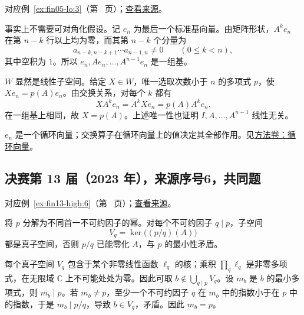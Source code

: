 \documentclass[12pt,fontset=fandol]{ctexart}
\begin{document}
对应例~\ref{ex:fin05-lo:3}（第~\pageref{ex:fin05-lo:3} 页）；\href{https://github.com/lzxcr/cmc-mathematics/blob/64916fa1fdbc3e444a652eca204d5669058ee321/src/problems/finals/05/06.md}{查看来源}。

\begin{solve}

事实上不需要可对角化假设。记 $e_n$ 为最后一个标准基向量。由矩阵形状，$A^ke_n$ 在第 $n-k$ 行以上均为零，而其第 $n-k$ 个分量为
\[
a_{n-k,n-k+1}\cdots a_{n-1,n}\ne0\qquad(0\le k<n),
\]
其中空积为 $1$。所以 $e_n,Ae_n,\ldots,A^{n-1}e_n$ 是一组基。

$W$ 显然是线性子空间。给定 $X\in W$，唯一选取次数小于 $n$ 的多项式 $p$，使 $Xe_n=p(A)e_n$。由交换关系，对每个 $k$ 都有
\[
XA^ke_n=A^kXe_n=p(A)A^ke_n.
\]
在一组基上相同，故 $X=p(A)$。上述唯一性也证明 $I,A,\ldots,A^{n-1}$ 线性无关。

\end{solve}

\begin{remark}[方法与条件]

$e_n$ 是一个循环向量；交换算子在循环向量上的值决定其全部作用。见\hyperref[app:linear-cyclic]{方法卷：循环向量}。

\end{remark}

\subsection{决赛第 13 届（2023 年），来源序号6，共同题}\label{ans:fin13-high:6}\label{pr:fin13-high:6}

对应例~\ref{ex:fin13-high:6}（第~\pageref{ex:fin13-high:6} 页）；\href{https://github.com/lzxcr/cmc-mathematics/blob/64916fa1fdbc3e444a652eca204d5669058ee321/src/problems/finals/13/06.md}{查看来源}。

\begin{solve}

将 $p$ 分解为不同首一不可约因子的幂。对每个不可约因子 $q\mid p$，子空间
\[
V_q=\ker\bigl((p/q)(A)\bigr)
\]
都是真子空间，否则 $p/q$ 已能零化 $A$，与 $p$ 的最小性矛盾。

每个真子空间 $V_q$ 包含于某个非零线性函数 $\ell_q$ 的核；乘积 $\prod_q\ell_q$ 是非零多项式，在无限域 $\mathbb C$ 上不可能处处为零。因此可取 $b\notin\bigcup_{q\mid p}V_q$。设 $m_b$ 是 $b$ 的最小多项式，则 $m_b\mid p$。若 $m_b\ne p$，至少一个不可约因子 $q$ 在 $m_b$ 中的指数小于在 $p$ 中的指数，于是 $m_b\mid p/q$，导致 $b\in V_q$，矛盾。因此 $m_b=p$。

\end{solve}
\end{document}
